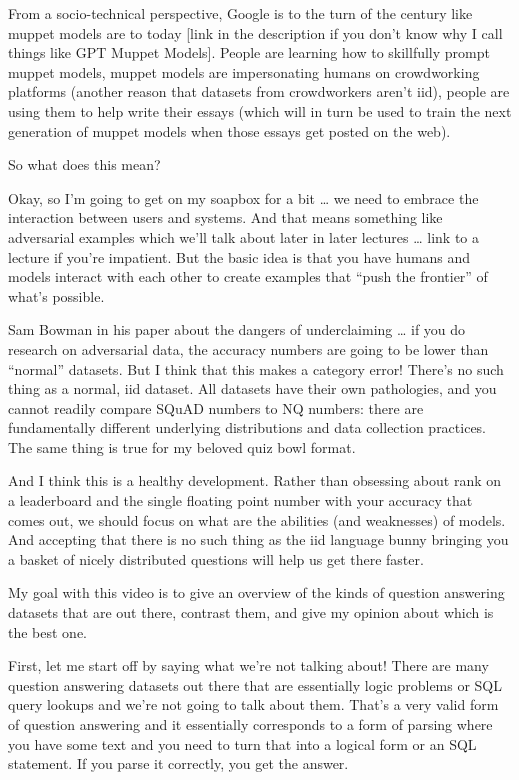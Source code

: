 From a socio-technical perspective, Google is to the turn of the century like muppet models are to today [link in the description if you don’t know why I call things like GPT Muppet Models].  People are learning how to skillfully prompt muppet models, muppet models are impersonating humans on crowdworking platforms (another reason that datasets from crowdworkers aren’t iid), people are using them to help write their essays (which will in turn be used to train the next generation of muppet models when those essays get posted on the web).  

So what does this mean?  

Okay, so I’m going to get on my soapbox for a bit … we need to embrace the interaction between users and systems.  And that means something like adversarial examples which we’ll talk about later in later lectures … link to a lecture if you’re impatient.  But the basic idea is that you have humans and models interact with each other to create examples that “push the frontier” of what’s possible.

Sam Bowman in his paper about the dangers of underclaiming … if you do research on adversarial data, the accuracy numbers are going to be lower than “normal” datasets.  But I think that this makes a category error!  There’s no such thing as a normal, iid dataset.  All datasets have their own pathologies, and you cannot readily compare SQuAD numbers to NQ numbers: there are fundamentally different underlying distributions and data collection practices.  The same thing is true for my beloved quiz bowl format.

And I think this is a healthy development.  Rather than obsessing about rank on a leaderboard and the single floating point number with your accuracy that comes out, we should focus on what are the abilities (and weaknesses) of models.  And accepting that there is no such thing as the iid language bunny bringing you a basket of nicely distributed questions will help us get there faster.

My goal with this video is to give an overview of the kinds of question answering datasets that are out there, contrast them, and give my opinion about which is the best one.

First, let me start off by saying what we're not talking about!  There are many question answering datasets out there that are essentially logic problems or SQL query lookups and we're not going to talk about them.  That's a very valid form of question answering and it essentially corresponds to a form of parsing where you have some text and you need to turn that into a logical form or an SQL statement.  If you parse it correctly, you get the answer.

